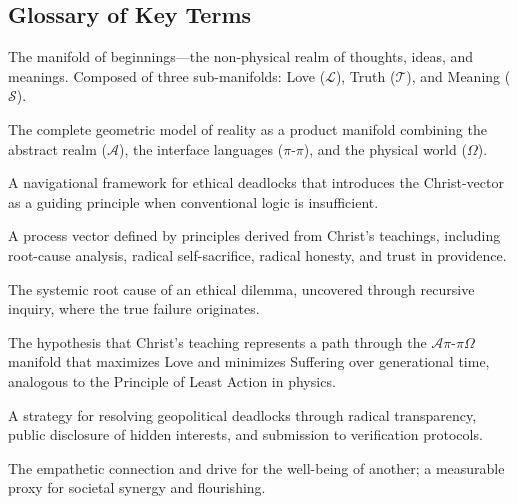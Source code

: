 \documentclass[11pt,a4paper]{article}
\begin{document}
\begin{small}
\section*{Glossary of Key Terms}

\begin{description}[style=nextline, leftmargin=0pt, labelindent=0pt, font=\normalfont\bfseries]
    \item[$\mathcal{A}$ (Alpha Manifold)] The manifold of beginnings—the non-physical realm of thoughts, ideas, and meanings. Composed of three sub-manifolds: Love ($\mathcal{L}$), Truth ($\mathcal{T}$), and Meaning ($\mathcal{S}$).
    
    \item[$\mathcal{A}\pi\text{-}\pi\Omega$ Manifold] The complete geometric model of reality as a product manifold combining the abstract realm ($\mathcal{A}$), the interface languages ($\pi\text{-}\pi$), and the physical world ($\Omega$).
    
    \item[Beacon Protocol] A navigational framework for ethical deadlocks that introduces the Christ-vector as a guiding principle when conventional logic is insufficient.
    
    \item[Christ-Vector] A process vector defined by principles derived from Christ's teachings, including root-cause analysis, radical self-sacrifice, radical honesty, and trust in providence.
    
    \item[Ethical Singularity] The systemic root cause of an ethical dilemma, uncovered through recursive inquiry, where the true failure originates.
    
    \item[Geodesic Ethics] The hypothesis that Christ's teaching represents a path through the $\mathcal{A}\pi\text{-}\pi\Omega$ manifold that maximizes Love and minimizes Suffering over generational time, analogous to the Principle of Least Action in physics.
    
    \item[Geopolitical Maieutics] A strategy for resolving geopolitical deadlocks through radical transparency, public disclosure of hidden interests, and submission to verification protocols.
    
    \item[Love (Operational Definition)] The empathetic connection and drive for the well-being of another; a measurable proxy for societal synergy and flourishing.
    

\end{description}
\end{small}
\end{document}
